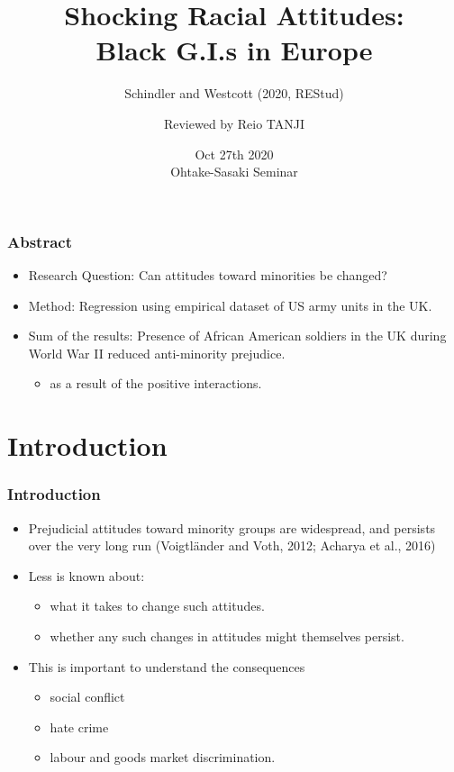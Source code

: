 \documentclass[dvipdfmx,11pt]{beamer}
\title{Shocking Racial Attitudes: \\ Black G.I.s in Europe}
\subtitle{Schindler and Westcott (2020, REStud)}
\author{Reviewed by Reio TANJI}
\date{Oct 27th 2020 \\ Ohtake-Sasaki Seminar}
\institute{Osaka University, Graduate School of Economics}
\begin{document}
\begin{frame}\frametitle{}
\titlepage
\end{frame}


\begin{frame}\frametitle{Abstract}
  \begin{itemize}
      \item Research Question: Can attitudes toward minorities be changed?
      \item Method: Regression using empirical dataset of US army units in the UK.
      \item Sum of the results: Presence of African American soldiers in the UK during World War II reduced anti-minority prejudice.
      \begin{itemize}
        \item  as a result of the positive interactions.
      \end{itemize}
  \end{itemize}
\end{frame}

\section{Introduction}
\begin{frame}\frametitle{Introduction}
  \begin{itemize}
    \item Prejudicial attitudes toward minority groups are widespread, and persists over the very long run (Voigtl\"{a}nder and Voth, 2012; Acharya et al., 2016)
    \item Less is known about:
    \begin{itemize}
      \item what it takes to change such attitudes.
      \item whether any such changes in attitudes might themselves persist.
    \end{itemize}
    \item This is important to understand the consequences
    \begin{itemize}
      \item social conflict
      \item hate crime
      \item labour and goods market discrimination.
    \end{itemize}
  \end{itemize}
\end{frame}
\end{document}
